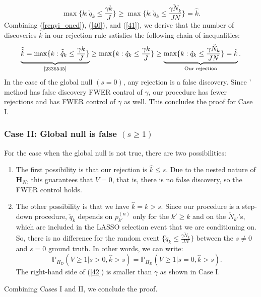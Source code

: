 \documentclass[11pt]{article}
\newcommand{\PP}{\mathbb{P}}
\begin{document}
	\begin{equation}\label{41}
		\max\{k:    {\check{q}}_k\leq\frac{\gamma k}{J}\}\geq \max\{k:    {\check{q}}_k\leq\frac{\gamma\check{N}_k}{JN}\}=\hat{k}.
	\end{equation}
	Combining (\ref{renyi_oned}), (\ref{40}), and (\ref{41}), we derive that the number of discoveries $\hat{k}$ in our rejection rule satisfies the following chain of inequalities:
	\begin{equation}
		\underbrace{\tilde{\hat{k}}=\max\{k:    \tilde{\check{q}}_k\leq\frac{\gamma k}{J}\}}_{\text{\cite{2336545}}}\geq\max\{k:    {\check{q}}_k\leq\frac{\gamma k}{J}\}\geq \underbrace{\max\{k:    {\check{q}}_k\leq\frac{\gamma\check{N}_k}{JN}\}=\hat{k}}_{\text{Our rejection}}.
	\end{equation}
	In the case of the global null $(s=0)$, any rejection is a false discovery. Since \cite{2336545}' method has false discovery FWER control of $\gamma$, our procedure has fewer rejections and has FWER control of $\gamma$ as well. This concludes the proof for Case I.
	
	
	\subsubsection*{Case II: Global null is false $(s\geq 1)$}\label{thm4p2}
	
	For the case when the global null is not true, there are two possibilities:
	\begin{enumerate}
		\item The first possibility is that our rejection is $\hat{k}\leq s$. Due to the nested nature of $\bm{H}_N$, this guarantees that $V=0$, that is, there is no false discovery, so the FWER control holds.
		\item The other possibility is that we have $\hat{k}=k>s$. Since our procedure is a step-down procedure, $\check{q}_k$ depends on $p^{(n)}_{k'}$ only for the $k'\geq k$ and on the $\check{N}_{k'}$'s, which are included in the LASSO selection event that we are conditioning on. So, there is no difference for the random event $\{\check{q}_k\leq\frac{\gamma\check{N}_k}{JN}\}$ between the $s\neq 0$ and $s=0$ ground truth. In other words, we can write:
		\begin{equation}\label{42}
			\PP_{H_D}(V\geq 1|s>0,\hat{k}>s)=\PP_{H_D}(V\geq 1|s=0,\hat{k}>s).
		\end{equation}
		The right-hand side of (\ref{42}) is smaller than $\gamma$ as shown in Case I.
	\end{enumerate}
	Combining Cases I and II, we conclude the proof.
	
\end{document}
